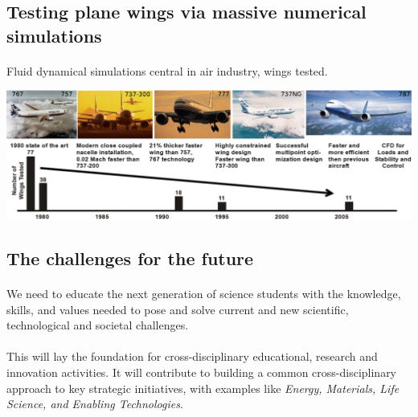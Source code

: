\documentclass[%
oneside,                 %
final,                   %
10pt]{article}
\begin{document}
\subsection{Testing plane wings via massive numerical simulations}

\paragraph{}
Fluid dynamical simulations central in air industry, wings tested.


\centerline{\includegraphics[width=1.0\linewidth]{fig-future/fig8.jpg}}





\subsection{The challenges for the future}

\paragraph{}
We need to educate the next generation of 
science students with the knowledge, skills, and values needed to pose
and solve current and new scientific, technological and societal
challenges.



\paragraph{}
This will lay the foundation for cross-disciplinary
educational, research and innovation activities. It will contribute to building a common cross-disciplinary
approach to key strategic initiatives, with examples like \emph{Energy, Materials, Life Science, and Enabling Technologies}.
\end{document}
